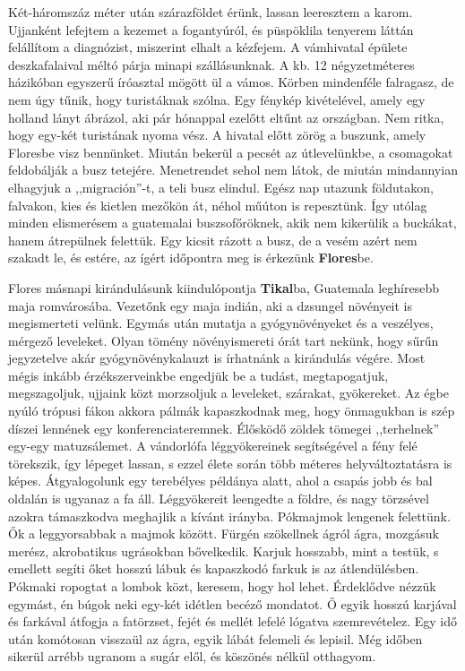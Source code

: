 Két-háromszáz méter után szárazföldet érünk, lassan leeresztem
a karom. Ujjanként lefejtem a kezemet a fogantyúról, és püspöklila
tenyerem láttán felállítom a diagnózist, miszerint elhalt a kézfejem.
A vámhivatal épülete deszkafalaival méltó párja minapi szállásunknak.
A kb. 12 négyzetméteres házikóban egyszerű íróasztal mögött
ül a vámos. Körben mindenféle falragasz, de nem úgy tűnik, hogy
turistáknak szólna. Egy fénykép kivételével, amely egy holland lányt
ábrázol, aki pár hónappal ezelőtt eltűnt az országban. Nem ritka,
hogy egy-két turistának nyoma vész. A hivatal előtt zörög a buszunk,
amely Floresbe visz bennünket. Miután bekerül a pecsét az útlevelünkbe,
a csomagokat feldobálják a busz tetejére. Menetrendet sehol
nem látok, de miután mindannyian elhagyjuk a ,,migración''-t, a teli
busz elindul. Egész nap utazunk földutakon, falvakon, kies és kietlen
mezőkön át, néhol műúton is repesztünk. Így utólag minden elismerésem
a guatemalai buszsofőröknek, akik nem kikerülik a buckákat,
hanem átrepülnek felettük. Egy kicsit rázott a busz, de a vesém azért
nem szakadt le, és estére, az ígért időpontra meg is érkezünk
\textbf{Flores}be.

Flores másnapi kirándulásunk kiindulópontja \textbf{Tikal}ba, Guatemala
leghíresebb maja romvárosába. Vezetőnk egy maja indián, aki a dzsungel
növényeit is megismerteti velünk. Egymás után mutatja a gyógynövényeket
és a veszélyes, mérgező leveleket. Olyan tömény növényismereti
órát tart nekünk, hogy sűrűn jegyzetelve akár gyógynövénykalauzt
is írhatnánk a kirándulás végére. Most mégis inkább érzékszerveinkbe
engedjük be a tudást, megtapogatjuk, megszagoljuk, ujjaink közt morzsoljuk
a leveleket, szárakat, gyökereket. Az égbe nyúló trópusi fákon
akkora pálmák kapaszkodnak meg, hogy önmagukban is szép díszei
lennének egy konferenciateremnek. Élősködő zöldek tömegei ,,terhelnek''
egy-egy matuzsálemet. A vándorlófa léggyökereinek segítségével
a fény felé törekszik, így lépeget lassan, s ezzel élete során több
méteres helyváltoztatásra is képes. Átgyalogolunk egy terebélyes példánya
alatt, ahol a csapás jobb és bal oldalán is ugyanaz a fa áll. Léggyökereit
leengedte a földre, és nagy törzsével azokra támaszkodva meghajlik a
kívánt irányba. Pókmajmok lengenek felettünk. Ők a leggyorsabbak
a majmok között. Fürgén szökellnek ágról ágra, mozgásuk merész,
akrobatikus ugrásokban bővelkedik. Karjuk hosszabb, mint a testük,
s emellett segíti őket hosszú lábuk és kapaszkodó farkuk is az
átlendülésben. Pókmaki ropogtat a lombok közt, keresem, hogy hol lehet.
Érdeklődve nézzük egymást, én búgok neki egy-két idétlen becéző
mondatot. Ő egyik hosszú karjával és farkával átfogja a fatörzset, fejét
és mellét lefelé lógatva szemrevételez. Egy idő után komótosan visszaül
az ágra, egyik lábát felemeli és lepisil. Még időben sikerül arrébb
ugranom a sugár elől, és köszönés nélkül otthagyom.

